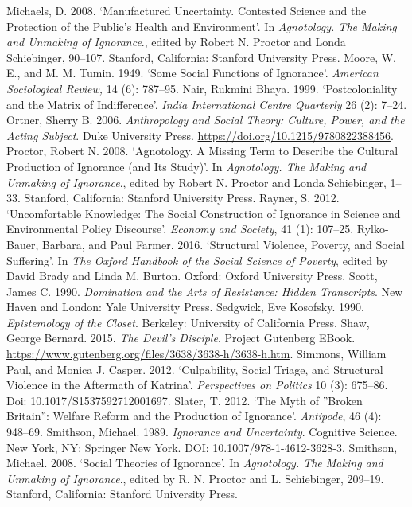 \begin{thebibliography}{99}
 Michaels, D. 2008. ‘Manufactured Uncertainty. Contested Science and the Protection of the Public’s Health and Environment’. In \textit{Agnotology. The Making and Unmaking of Ignorance}., edited by Robert N. Proctor and Londa Schiebinger, 90–107. Stanford, California: Stanford University Press.
 Moore, W. E., and M. M. Tumin. 1949. ‘Some Social Functions of Ignorance’. \textit{American Sociological Review,} 14 (6): 787–95.
 Nair, Rukmini Bhaya. 1999. ‘Postcoloniality and the Matrix of Indifference’. \textit{India International Centre Quarterly} 26 (2): 7–24.
 Ortner, Sherry B. 2006. \textit{Anthropology and Social Theory: Culture, Power, and the Acting Subject}. Duke University Press. \url{https://doi.org/10.1215/9780822388456}.
 Proctor, Robert N. 2008. ‘Agnotology. A Missing Term to Describe the Cultural Production of Ignorance (and Its Study)’. In \textit{Agnotology. The Making and Unmaking of Ignorance}., edited by Robert N. Proctor and Londa Schiebinger, 1–33. Stanford, California: Stanford University Press.
 Rayner, S. 2012. ‘Uncomfortable Knowledge: The Social Construction of Ignorance in Science and Environmental Policy Discourse’. \textit{Economy and Society}, 41 (1): 107–25.
 Rylko-Bauer, Barbara, and Paul Farmer. 2016. ‘Structural Violence, Poverty, and Social Suffering’. In \textit{The Oxford Handbook of the Social Science of Poverty}, edited by David Brady and Linda M. Burton. Oxford: Oxford University Press. 
 Scott, James C. 1990. \textit{Domination and the Arts of Resistance: Hidden Transcripts}. New Haven and London: Yale University Press.
 Sedgwick, Eve Kosofsky. 1990.\textit{ Epistemology of the Closet}. Berkeley: University of California Press.
 Shaw, George Bernard. 2015. \textit{The Devil’s Disciple}. Project Gutenberg EBook. \url{https://www.gutenberg.org/files/3638/3638-h/3638-h.htm}.
 Simmons, William Paul, and Monica J. Casper. 2012. ‘Culpability, Social Triage, and Structural Violence in the Aftermath of Katrina’. \textit{Perspectives on Politics} 10 (3): 675–86. Doi: 10.1017/S1537592712001697.
 Slater, T. 2012. ‘The Myth of ”Broken Britain”: Welfare Reform and the Production of Ignorance’. \textit{Antipode}, 46 (4): 948–69.
 Smithson, Michael.  1989. \textit{Ignorance and Uncertainty}. Cognitive Science. New York, NY: Springer New York. DOI: 10.1007/978-1-4612-3628-3.
 Smithson, Michael. 2008. ‘Social Theories of Ignorance’. In \textit{Agnotology. The Making and Unmaking of Ignorance}., edited by R. N. Proctor and L. Schiebinger, 209–19. Stanford, California: Stanford University Press.

\end{thebibliography}
